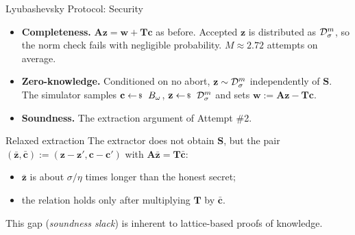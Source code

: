 \documentclass{zkdl-presentation-template}
\begin{document}
    \begin{frame}{Lyubashevsky Protocol: Security}
        \begin{itemize}
            \item \textbf{Completeness.} $\mathbf{A}\mathbf{z} = \mathbf{w} + \mathbf{T}\mathbf{c}$ as before. Accepted $\mathbf{z}$ is distributed as $\mathcal{D}^m_{\sigma}$, so the norm check fails with negligible probability. $M \approx 2.72$ attempts on average.\pause
            \item \textbf{Zero-knowledge.} Conditioned on no abort, $\mathbf{z} \sim \mathcal{D}^m_{\sigma}$ independently of $\mathbf{S}$. The simulator samples $\mathbf{c} \leftarrowS B_{\omega}$, $\mathbf{z} \leftarrowS \dgaussian^m_{\sigma}$ and sets $\mathbf{w} := \mathbf{A}\mathbf{z} - \mathbf{T}\mathbf{c}$.\pause
            \item \textbf{Soundness.} The extraction argument of Attempt \#2.
        \end{itemize}
        \pause

        \begin{remarkblock}{Relaxed extraction}
            The extractor does not obtain $\mathbf{S}$, but the pair $(\bar{\mathbf{z}}, \bar{\mathbf{c}}) := (\mathbf{z}-\mathbf{z}', \mathbf{c}-\mathbf{c}')$ with $\mathbf{A}\bar{\mathbf{z}} = \mathbf{T}\bar{\mathbf{c}}$:
            \begin{itemize}
                \item $\bar{\mathbf{z}}$ is about $\sigma/\eta$ times longer than the honest secret;
                \item the relation holds only after multiplying $\mathbf{T}$ by $\bar{\mathbf{c}}$.
            \end{itemize}
            This gap (\emph{soundness slack}) is inherent to lattice-based proofs of knowledge.
        \end{remarkblock}
    \end{frame}
\end{document}
